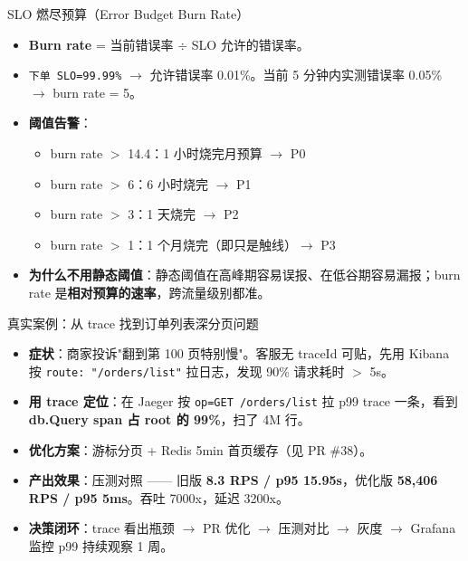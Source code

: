 \documentclass[aspectratio=169,11pt]{beamer}
\begin{document}
\begin{frame}[shrink]{SLO 燃尽预算（Error Budget Burn Rate）}
\begin{itemize}
  \item \textbf{Burn rate} = 当前错误率 $\div$ SLO 允许的错误率。
  \item \texttt{下单 SLO=99.99\%} $\to$ 允许错误率 0.01\%。当前 5 分钟内实测错误率 0.05\% $\to$ burn rate = 5。
  \item \textbf{阈值告警}：
  \begin{itemize}
    \item burn rate $>$ 14.4：1 小时烧完月预算 $\to$ P0
    \item burn rate $>$ 6：6 小时烧完 $\to$ P1
    \item burn rate $>$ 3：1 天烧完 $\to$ P2
    \item burn rate $>$ 1：1 个月烧完（即只是触线）$\to$ P3
  \end{itemize}
  \item \textbf{为什么不用静态阈值}：静态阈值在高峰期容易误报、在低谷期容易漏报；burn rate 是\textbf{相对预算的速率}，跨流量级别都准。
\end{itemize}
\end{frame}

\begin{frame}[shrink]{真实案例：从 trace 找到订单列表深分页问题}
\begin{itemize}
  \item \textbf{症状}：商家投诉"翻到第 100 页特别慢"。客服无 traceId 可贴，先用 Kibana 按 \texttt{route: "/orders/list"} 拉日志，发现 90\% 请求耗时 $>$ 5s。
  \item \textbf{用 trace 定位}：在 Jaeger 按 \texttt{op=GET /orders/list} 拉 p99 trace 一条，看到 \textbf{db.Query span 占 root 的 99\%}，扫了 4M 行。
  \item \textbf{优化方案}：游标分页 + Redis 5min 首页缓存（见 PR \#38）。
  \item \textbf{产出效果}：压测对照 —— 旧版 \textbf{8.3 RPS / p95 15.95s}，优化版 \textbf{58{,}406 RPS / p95 5ms}。吞吐 7000x，延迟 3200x。
  \item \textbf{决策闭环}：trace 看出瓶颈 $\to$ PR 优化 $\to$ 压测对比 $\to$ 灰度 $\to$ Grafana 监控 p99 持续观察 1 周。
\end{itemize}
\end{frame}
\end{document}

